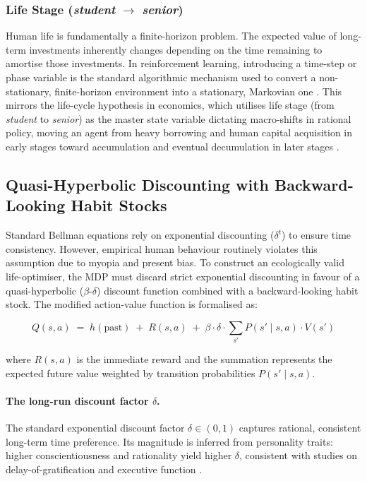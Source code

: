 \documentclass[11pt, a4paper]{article}
\begin{document}
\subsubsection{Life Stage (\textit{student} $\rightarrow$ \textit{senior})}

Human life is fundamentally a finite-horizon problem. The expected value of long-term
investments inherently changes depending on the time remaining to amortise those investments.
In reinforcement learning, introducing a time-step or phase variable is the standard
algorithmic mechanism used to convert a non-stationary, finite-horizon environment into a
stationary, Markovian one \citep{Sutton2018}. This mirrors the life-cycle hypothesis in
economics, which utilises life stage (from \textit{student} to \textit{senior}) as the master
state variable dictating macro-shifts in rational policy, moving an agent from heavy borrowing
and human capital acquisition in early stages toward accumulation and eventual decumulation in
later stages \citep{Modigliani1954}.

\subsection{Quasi-Hyperbolic Discounting with Backward-Looking Habit Stocks}

Standard Bellman equations rely on exponential discounting ($\delta^{t}$) to ensure time
consistency. However, empirical human behaviour routinely violates this assumption due to
myopia \citep{Strotz1955} and present bias. To construct an ecologically valid life-optimiser,
the MDP must discard strict exponential discounting in favour of a quasi-hyperbolic
($\beta$-$\delta$) discount function combined with a backward-looking habit stock. The
modified action-value function is formalised as:

\begin{equation}
  Q(s,a) \;=\; h(\text{past}) \;+\; R(s,a) \;+\; \beta \cdot \delta
  \cdot \sum_{s'} P(s'\mid s,a)\cdot V(s')
  \label{eq:quasi-hyperbolic-Q}
\end{equation}

\noindent
where $R(s,a)$ is the immediate reward and the summation represents the expected future value
weighted by transition probabilities $P(s'\mid s,a)$.

\paragraph{The long-run discount factor $\delta$.}
The standard exponential discount factor $\delta \in (0,1)$ captures rational, consistent
long-term time preference. Its magnitude is inferred from personality traits: higher
conscientiousness and rationality yield higher $\delta$, consistent with studies on
delay-of-gratification and executive function \citep{Sutton2018}.
\end{document}
